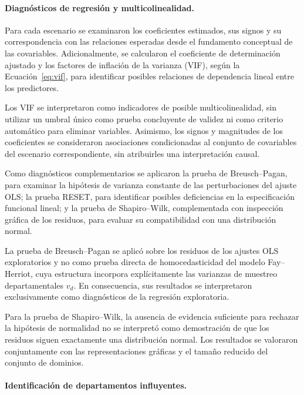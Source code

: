 \paragraph{Diagnósticos de regresión y multicolinealidad.}

Para cada escenario se examinaron los coeficientes estimados, sus signos y su correspondencia con las relaciones esperadas desde el fundamento conceptual de las covariables. Adicionalmente, se calcularon el coeficiente de determinación ajustado y los factores de inflación de la varianza (VIF), según la Ecuación~\ref{eq:vif}, para identificar posibles relaciones de dependencia lineal entre los predictores.

Los VIF se interpretaron como indicadores de posible multicolinealidad, sin utilizar un umbral único como prueba concluyente de validez ni como criterio automático para eliminar variables. Asimismo, los signos y magnitudes de los coeficientes se consideraron asociaciones condicionadas al conjunto de covariables del escenario correspondiente, sin atribuirles una interpretación causal.

Como diagnósticos complementarios se aplicaron la prueba de Breusch--Pagan, para examinar la hipótesis de varianza constante de las perturbaciones del ajuste OLS; la prueba RESET, para identificar posibles deficiencias en la especificación funcional lineal; y la prueba de Shapiro--Wilk, complementada con inspección gráfica de los residuos, para evaluar su compatibilidad con una distribución normal.

La prueba de Breusch--Pagan se aplicó sobre los residuos de los ajustes OLS exploratorios y no como prueba directa de homocedasticidad del modelo Fay--Herriot, cuya estructura incorpora explícitamente las varianzas de muestreo departamentales $v_d$. En consecuencia, sus resultados se interpretaron exclusivamente como diagnósticos de la regresión exploratoria.

Para la prueba de Shapiro--Wilk, la ausencia de evidencia suficiente para rechazar la hipótesis de normalidad no se interpretó como demostración de que los residuos siguen exactamente una distribución normal. Los resultados se valoraron conjuntamente con las representaciones gráficas y el tamaño reducido del conjunto de dominios.

\paragraph{Identificación de departamentos influyentes.}

